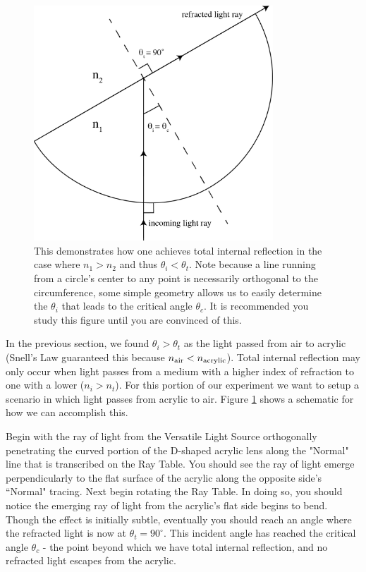 \begin{figure}[h]
\centering
\includegraphics[width=0.8\textwidth]{./Exp6/pic/tirdiagram.png}
\caption{This demonstrates how one achieves total internal reflection in the case where $n_{1}>n_{2}$ and thus $\theta_{i}<\theta_{t}$.  Note because a line running from a circle's center to any point is necessarily orthogonal to the circumference, some simple geometry allows us to easily determine the $\theta_{i}$ that leads to the critical angle $\theta_{c}$.  It is recommended you study this figure until you are convinced of this.}
\label{fig:tirdiagram}
\end{figure}

In the previous section, we found $\theta_{i} > \theta_{t}$ as the light passed from air to acrylic (Snell's Law guaranteed this because $n_{\rm air} < n_{\rm acrylic}$).  Total internal reflection may only occur when light passes from a medium with a higher index of refraction to one with a lower ($n_{i} > n_{t}$).  For this portion of our experiment we want to setup a scenario in which light passes from acrylic to air.  Figure \ref{fig:tirdiagram} shows a schematic for how we can accomplish this.\myskip

Begin with the ray of light from the Versatile Light Source orthogonally penetrating the curved portion of the D-shaped acrylic lens along the "Normal" line that is transcribed on the Ray Table.  You should see the ray of light emerge perpendicularly to the flat surface of the acrylic along the opposite side's ``Normal" tracing.  Next begin rotating the Ray Table.  In doing so, you should notice the emerging ray of light from the acrylic's flat side begins to bend.  Though the effect is initially subtle, eventually you should reach an angle where the refracted light is now at $\theta_{t}=90^{\circ}$.  This incident angle has reached the critical angle $\theta_{c}$ - the point beyond which we have total internal reflection, and no refracted light escapes from the acrylic.

